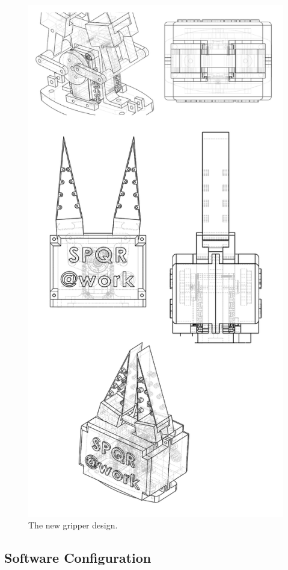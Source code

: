 \documentclass{llncs}
\begin{document}
\begin{figure}[t!]
\begin{center}
\includegraphics[angle=90,width=0.8\linewidth,]{images/gripper_design.png}
\end{center}
\caption{The new gripper design.}\label{fig:gripper_design}
\end{figure}

 
\subsection{Software Configuration}
\end{document}
